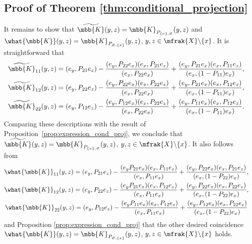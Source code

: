 \subsection{Proof of Theorem \ref{thm:conditional_projection}}
It remains to show that $\widetilde{\mbb{K}}(y,z)=\mbb{K}_{P_{\{x\},\varnothing}}(y,z)$ and $\what{\mbb{K}}(y,z)=\mbb{K}_{P_{\varnothing,\{x\}}}(y,z)$, $y,z\in \mfrak{X}\backslash\{x\}$.
It is straightforward that
\begin{gather*}
\widetilde{\mbb{K}}_{11}(y,z)=(e_{y},P_{21}e_{z})-\frac{(e_{y},P_{22}e_{x})(e_{x},P_{21}e_{z})}{(e_{x},P_{22}e_{x})}+\frac{(e_{y},P_{21}e_{x})(e_{x},P_{11}e_{z})}{(e_{x},(1-P_{11})e_{x})}, \\
\widetilde{\mbb{K}}_{12}(y,z)=(e_{y},P_{22}e_{z})-\frac{(e_{y},P_{22}e_{x})(e_{x},P_{22}e_{z})}{(e_{x},P_{22}e_{x})}+\frac{(e_{y},P_{21}e_{x})(e_{x},P_{12}e_{z})}{(e_{x},(1-P_{11})e_{x})}, \\
\widetilde{\mbb{K}}_{22}(y,z)=(e_{y},P_{12}e_{z})-\frac{(e_{y},P_{12}e_{x})(e_{x},P_{22}e_{z})}{(e_{x},P_{22}e_{x})}+\frac{(e_{y},P_{11}e_{x})(e_{x},P_{12}e_{z})}{(e_{x},(1-P_{11})e_{x})}.
\end{gather*}
Comparing these descriptions with the result of Proposition~\ref{prop:expression_cond_proj}, we conclude that $\widetilde{\mbb{K}}(y,z)=\mbb{K}_{P_{\{x\},\varnothing}}(y,z)$, $y,z\in\mfrak{X}\backslash\{x\}$.
It also follows from
\begin{gather*}
\what{\mbb{K}}_{11}(y,z)=(e_{y},P_{21}e_{z})-\frac{(e_{y}P_{21}e_{x})(e_{x},P_{11}e_{z})}{(e_{x},P_{11}e_{x})}+\frac{(e_{y},P_{22}e_{x})(e_{x},P_{21}e_{z})}{(e_{x},(1-P_{22})e_{x})}, \\
\what{\mbb{K}}_{12}(y,z)=(e_{y},P_{22}e_{z})-\frac{(e_{y}P_{21}e_{x})(e_{x},P_{12}e_{z})}{(e_{x},P_{11}e_{x})}+\frac{(e_{y},P_{22}e_{x})(e_{x},P_{22}e_{z})}{(e_{x},(1-P_{22})e_{x})}, \\
\what{\mbb{K}}_{22}(y,z)=(e_{y},P_{12}e_{z})-\frac{(e_{y}P_{11}e_{x})(e_{x},P_{12}e_{z})}{(e_{x},P_{11}e_{x})}+\frac{(e_{y},P_{12}e_{x})(e_{x},P_{22}e_{z})}{(e_{x},(1-P_{22})e_{x})}
\end{gather*}
and Proposition \ref{prop:expression_cond_proj} that the other desired coincidence $\what{\mbb{K}}(y,z)=\mbb{K}_{P_{\varnothing,\{x\}}}(y,z)$, $y,z\in \mfrak{X}\backslash\{x\}$ holds.

